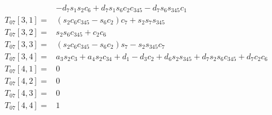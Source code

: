 \documentclass{article}
\begin{document}
\begin{align}
              & - d_{7} s_{1} s_{2} c_{6} + d_{7} s_{1} s_{6} c_{2} c_{345} - d_{7} s_{6} s_{345} c_{1} \nonumber \\
T_{07}[3, 1] =& \left(s_{2} c_{6} c_{345} - s_{6} c_{2}\right) c_{7} + s_{2} s_{7} s_{345} \nonumber \\
T_{07}[3, 2] =& s_{2} s_{6} c_{345} + c_{2} c_{6} \nonumber \\
T_{07}[3, 3] =& \left(s_{2} c_{6} c_{345} - s_{6} c_{2}\right) s_{7} - s_{2} s_{345} c_{7} \nonumber \\
T_{07}[3, 4] =& a_{3} s_{2} c_{3} + a_{4} s_{2} c_{34} + d_{1} - d_{3} c_{2} + d_{6} s_{2} s_{345} + d_{7} s_{2} s_{6} c_{345} + d_{7} c_{2} c_{6} \nonumber \\
T_{07}[4, 1] =& 0 \nonumber \\
T_{07}[4, 2] =& 0 \nonumber \\
T_{07}[4, 3] =& 0 \nonumber \\
T_{07}[4, 4] =& 1 \nonumber
\end{align}
\end{document}
